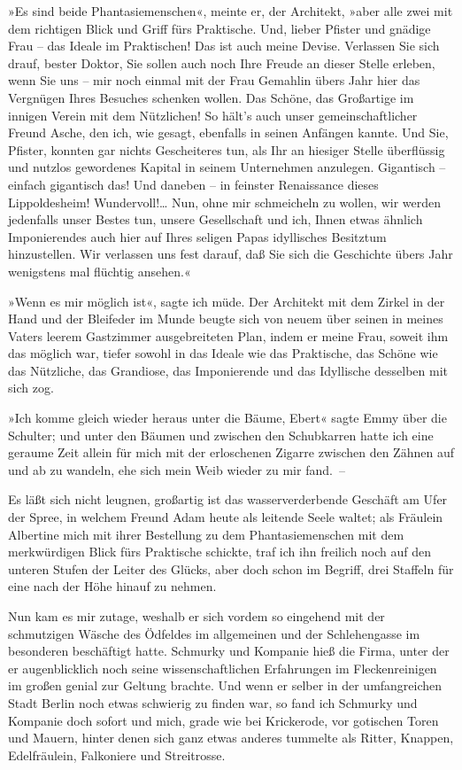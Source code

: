 »Es sind beide Phantasiemenschen«, meinte er, der Architekt, »aber
alle zwei mit dem richtigen Blick und Griff fürs Praktische. Und,
lieber Pfister und gnädige Frau – das Ideale im Praktischen! Das
ist auch meine Devise. Verlassen Sie sich drauf, bester Doktor, Sie
sollen auch noch Ihre Freude an dieser Stelle erleben, wenn Sie uns
– mir noch einmal mit der Frau Gemahlin übers Jahr hier das
Vergnügen Ihres Besuches schenken wollen. Das Schöne, das
Großartige im innigen Verein mit dem Nützlichen! So hält's auch
unser gemeinschaftlicher Freund Asche, den ich, wie gesagt,
ebenfalls in seinen Anfängen kannte. Und Sie, Pfister, konnten gar
nichts Gescheiteres tun, als Ihr an hiesiger Stelle überflüssig und
nutzlos gewordenes Kapital in seinem Unternehmen anzulegen.
Gigantisch – einfach gigantisch das! Und daneben – in feinster
Renaissance dieses Lippoldesheim! Wundervoll!\ldots{} Nun, ohne mir
schmeicheln zu wollen, wir werden jedenfalls unser Bestes tun,
unsere Gesellschaft und ich, Ihnen etwas ähnlich Imponierendes auch
hier auf Ihres seligen Papas idyllisches Besitztum hinzustellen.
Wir verlassen uns fest darauf, daß Sie sich die Geschichte übers
Jahr wenigstens mal flüchtig ansehen.«

»Wenn es mir möglich ist«, sagte ich müde. Der Architekt mit dem
Zirkel in der Hand und der Bleifeder im Munde beugte sich von neuem
über seinen in meines Vaters leerem Gastzimmer ausgebreiteten Plan,
indem er meine Frau, soweit ihm das möglich war, tiefer sowohl in
das Ideale wie das Praktische, das Schöne wie das Nützliche, das
Grandiose, das Imponierende und das Idyllische desselben mit sich
zog.

»Ich komme gleich wieder heraus unter die Bäume, Ebert« sagte Emmy
über die Schulter; und unter den Bäumen und zwischen den
Schubkarren hatte ich eine geraume Zeit allein für mich mit der
erloschenen Zigarre zwischen den Zähnen auf und ab zu wandeln, ehe
sich mein Weib wieder zu mir fand.~–

Es läßt sich nicht leugnen, großartig ist das wasserverderbende
Geschäft am Ufer der Spree, in welchem Freund Adam heute als
leitende Seele waltet; als Fräulein Albertine mich mit ihrer
Bestellung zu dem Phantasiemenschen mit dem merkwürdigen Blick fürs
Praktische schickte, traf ich ihn freilich noch auf den unteren
Stufen der Leiter des Glücks, aber doch schon im Begriff, drei
Staffeln für eine nach der Höhe hinauf zu nehmen.

Nun kam es mir zutage, weshalb er sich vordem so eingehend mit der
schmutzigen Wäsche des Ödfeldes im allgemeinen und der
Schlehengasse im besonderen beschäftigt hatte. Schmurky und
Kompanie hieß die Firma, unter der er augenblicklich noch seine
wissenschaftlichen Erfahrungen im Fleckenreinigen im großen genial
zur Geltung brachte. Und wenn er selber in der umfangreichen Stadt
Berlin noch etwas schwierig zu finden war, so fand ich Schmurky und
Kompanie doch sofort und mich, grade wie bei Krickerode, vor
gotischen Toren und Mauern, hinter denen sich ganz etwas anderes
tummelte als Ritter, Knappen, Edelfräulein, Falkoniere und
Streitrosse.

